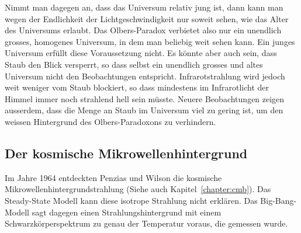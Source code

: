 Nimmt man dagegen an, dass das Universum relativ jung ist, dann kann
man wegen der Endlichkeit der Lichtgeschwindigkeit nur soweit sehen,
wie das Alter des Universums erlaubt.
Das Olbers-Paradox verbietet also nur ein unendlich grosses, homogenes
Universum, in dem man beliebig weit sehen kann. 
Ein junges Universum erfüllt diese Voraussetzung nicht. 
Es könnte aber auch sein, dass Staub den Blick versperrt, so dass selbst
ein unendlich grosses und altes Universum nicht den Beobachtungen entspricht.
Infrarotstrahlung wird jedoch weit weniger vom Staub blockiert, so dass
mindestens im Infrarotlicht der Himmel immer noch strahlend hell sein
müsste.
Neuere Beobachtungen zeigen ausserdem, dass die Menge an Staub im
Universum viel zu gering ist, um den weissen Hintergrund des
Olbers-Paradoxons zu verhindern.

\subsection{Der kosmische Mikrowellenhintergrund}
Im Jahre 1964 entdeckten Penzias und Wilson die kosmische
%
%
Mikrowellenhintergrundstrahlung (Siehe auch Kapitel~\ref{chapter:cmb}).
Das Steady-State Modell kann diese isotrope Strahlung nicht erklären.
Das Big-Bang-Modell sagt dagegen einen Strahlungshintergrund mit einem
Schwarzkörperspektrum zu genau der Temperatur voraus, die gemessen
wurde.




